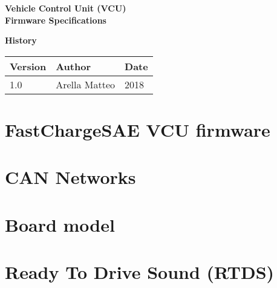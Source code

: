 \documentclass[twoside]{book}
\newcommand{\+}{\discretionary{\mbox{\scriptsize$\hookleftarrow$}}{}{}}
\newcommand{\clearemptydoublepage}{%
  \newpage{\pagestyle{empty}\cleardoublepage}%
}
\begin{document}
\hypersetup{pageanchor=false,
             bookmarksnumbered=true,
             pdfencoding=unicode
            }
\begin{titlepage}
\vspace*{7cm}
\begin{center}%
{\Large \textbf{Vehicle Control Unit (VCU) }}\\
\vspace*{1cm}
{\large \textbf{Firmware Specifications}}\\
\end{center}
\end{titlepage}
\clearemptydoublepage
{}

\begin{center}
{\Large \textbf{History}}\\
\vspace*{1cm}
\begin{table}[htbp]
    \centering
    \begin{tabularx}{\textwidth}{| X | X | X |}
        \hline
		\textbf{Version} & \textbf{Author} & \textbf{Date} \\ \hline
		1.0              & Arella Matteo   & 2018          \\ \hline
	\end{tabularx}
\end{table}
\end{center}

\tableofcontents
\clearemptydoublepage
{}
\hypersetup{pageanchor=true}

\chapter{Fast\+Charge\+S\+AE V\+CU firmware}
\label{index}\hypertarget{index}{}
\chapter{C\+AN Networks}
\label{_c_a_n}

\chapter{Board model}
\label{_model_page}

\chapter{Ready To Drive Sound (R\+T\+DS)}
\label{_r_t_d_s}

\end{document}
